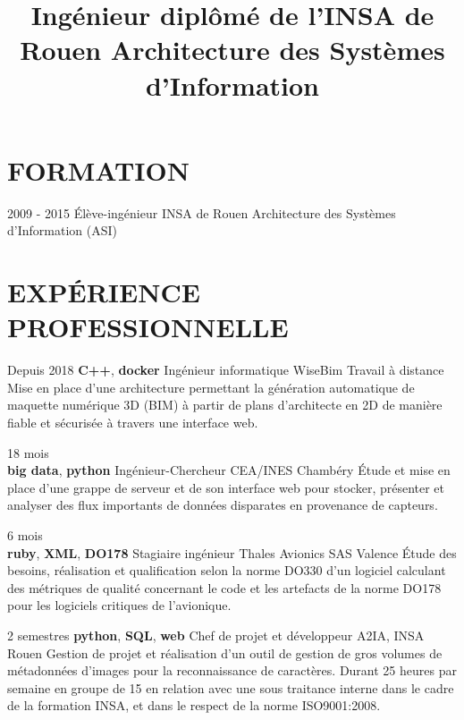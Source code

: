 \documentclass[11pt,a4paper]{moderncv}
\title{
  Ingénieur diplômé de l'INSA de Rouen \newline{}
  Architecture des Systèmes d'Information
}
\begin{document}
  \maketitle

  \section{FORMATION}



  \cventry
    {2009 - 2015}
    {Élève-ingénieur}
    {INSA de Rouen}
    {Architecture des Systèmes d'Information (ASI)}
    {}{}

  \section{EXPÉRIENCE PROFESSIONNELLE}

  \cventry
    {Depuis 2018 \textbf{C++}, \textbf{docker}}
    {Ingénieur informatique}
    {WiseBim}
    {Travail à distance}
    {}{
      Mise en place d'une architecture permettant la génération automatique de
      maquette numérique 3D (BIM) à partir de plans d'architecte en 2D de
      manière fiable et sécurisée à travers une interface web.
    }

  \cventry
    {18 mois \\ \textbf{big data}, \textbf{python}}
    {Ingénieur-Chercheur}
    {CEA/INES}
    {Chambéry}
    {}{
      Étude et mise en place d'une grappe de serveur et de son interface web
      pour stocker, présenter et analyser des flux importants de données
      disparates en provenance de capteurs.
    }

  \cventry
    {6 mois \\ \textbf{ruby}, \textbf{XML}, \textbf{DO178}}
    {Stagiaire ingénieur}
    {Thales Avionics SAS}
    {Valence}
    {}{
      Étude des besoins, réalisation et qualification selon la norme DO330
      d'un logiciel calculant des métriques de qualité concernant le code et
      les artefacts de la norme DO178 pour les logiciels critiques de
      l'avionique.
    }

  \cventry
    {2 semestres \textbf{python}, \textbf{SQL}, \textbf{web}}
    {Chef de projet et développeur}
    {A2IA, INSA}
    {Rouen}
    {}{
      Gestion de projet et réalisation d'un outil de gestion de gros volumes de
      métadonnées d'images pour la reconnaissance de caractères. Durant 25
      heures par semaine en groupe de 15 en relation avec une sous traitance
      interne dans le cadre de la formation INSA, et dans le respect de la
      norme ISO9001:2008.
    }
\end{document}
